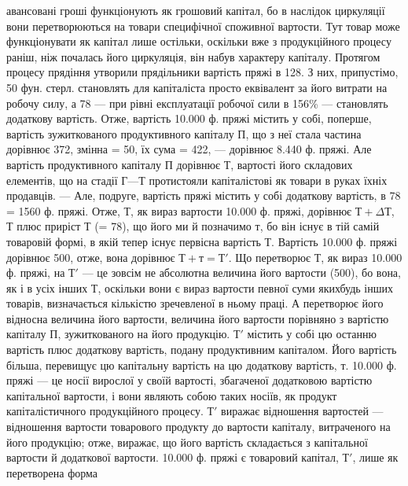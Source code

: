 \parcont{}  %
авансовані гроші функціонують як грошовий капітал, бо в наслідок
циркуляції вони перетворюються на товари специфічної споживної
вартости. Тут товар може функціонувати як капітал лише остільки,
оскільки вже з продукційного процесу раніш, ніж почалась його циркуляція,
він набув характеру капіталу. Протягом процесу прядіння утворили
прядільники вартість пряжі в 128. З них, припустімо, 50 фун.
стерл. становлять для капіталіста просто еквівалент за його витрати на
робочу силу, а 78 — при рівні експлуатації робочої сили в 156\%
— становлять додаткову вартість. Отже, вартість 10.000 ф. пряжі містить у
собі, поперше, вартість зужиткованого продуктивного капіталу П, що з неї
стала частина дорівнює 372, змінна = 50, їх
сума = 422, — дорівнює 8.440 ф. пряжі. Але вартість
продуктивного капіталу П дорівнює Т, вартості його складових елементів,
що на стадії $Г — Т$ протистояли капіталістові як товари в руках їхніх
продавців. — Але, подруге, вартість пряжі містить у собі додаткову вартість,
в 78 = 1560 ф. пряжі. Отже, $Т$, як вираз вартости 10.000 ф.
пряжі, дорівнює $Т + ΔТ$, $Т$ плюс приріст $Т$ (= 78), що його ми й
позначимо $т$, бо він існує в тій самій товаровій формі, в якій тепер існує
первісна вартість $Т$. Вартість 10.000 ф. пряжі дорівнює 500, отже,
вона дорівнює $Т + т = Т'$. Що перетворює $Т$, як вираз 10.000 ф. пряжі, на
$Т'$ — це зовсім не абсолютна величина його вартости (500), бо вона,
як і в усіх інших $Т$, оскільки вони є вираз вартости певної суми якихбудь
інших товарів, визначається кількістю зречевленої в ньому праці.
А перетворює його відносна величина його вартости, величина його
вартости порівняно з вартістю капіталу $П$, зужиткованого на його
продукцію. $Т'$ містить у собі цю останню вартість плюс додаткову
вартість, подану продуктивним капіталом. Його вартість більша, перевищує
цю капітальну вартість на цю додаткову вартість, $т$. 10.000 ф.
пряжі — це носії вирослої у своїй вартості, збагаченої додатковою вартістю
капітальної вартости, і вони являють собою таких носіїв, як
продукт капіталістичного продукційного процесу. $Т'$ виражає відношення
вартостей — відношення вартости товарового продукту до
вартости капіталу, витраченого на його продукцію; отже, виражає, що
його вартість складається з капітальної вартости й додаткової вартости.
10.000 ф. пряжі є товаровий капітал, $Т'$, лише як перетворена форма
